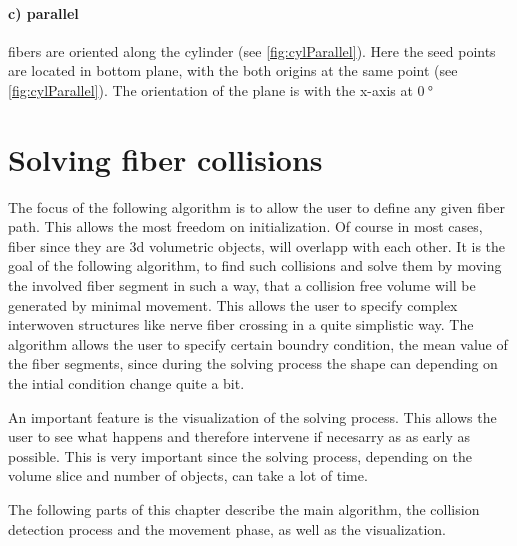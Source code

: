 \paragraph{c) parallel} fibers are oriented along the cylinder (see \cref{fig:cylParallel}).
Here the seed points are located in bottom plane, with the both origins at the same point (see \cref{fig:cylParallel}). The orientation of the plane is with the x-axis at $\SI{0}{\degree}$
%
%
%
\section{Solving fiber collisions}
\label{sec:Solver}
%
The focus of the following algorithm is to allow the user to define any given fiber path.
This allows the most freedom on initialization.
Of course in most cases, fiber since they are 3d volumetric objects, will overlapp with each other.
It is the goal of the following algorithm, to find such collisions and solve them by moving the involved fiber segment in such a way, that a collision free volume will be generated by minimal movement.
%
This allows the user to specify complex interwoven structures like nerve fiber crossing in a quite simplistic way.
%
The algorithm allows the user to specify certain boundry condition, \eg{} the mean value of the fiber segments, since during the solving process the shape can depending on the intial condition change quite a bit.
\par
An important feature is the visualization of the solving process.
This allows the user to see what happens and therefore intervene if necesarry as as early as possible.
This is very important since the solving process, depending on the volume slice and number of objects, can take a lot of time.
\par
%
The following parts of this chapter describe the main algorithm, \ie{} the collision detection process and the movement phase, as well as the visualization.
%
%
% 
